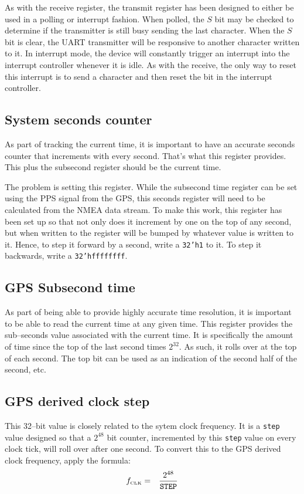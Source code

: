 \documentclass{gqtekspec}
\begin{document}
As with the receive register, the transmit register has been designed to either
be used in a polling or interrupt fashion.  When polled, the $S$ bit may be
checked to determine if the transmitter is still busy sending the last
character.  When the $S$ bit is clear, the UART transmitter will be responsive
to another character written to it.  In interrupt mode, the device will
constantly trigger an interrupt into the interrupt controller whenever  it is
idle.  As with the receive, the only way to reset this interrupt is to send
a character and then reset the bit in the interrupt controller.

\subsection{System seconds counter}
As part of tracking the current time, it is important to have an accurate
seconds counter that increments with every second.  That's what this register
provides.  This plus the subsecond register should be the current time.

The problem is setting this register.  While the subsecond time register can be
set using the PPS signal from the GPS, this seconds register will need to be
calculated from the NMEA data stream.  To make this work, this register has been
set up so that not only does it increment by one on the top of any second, but
when written to the register will be bumped by whatever value is written to it.
Hence, to step it forward by a second, write a {\tt 32'h1} to it.  To step it
backwards, write a {\tt 32'hffffffff}.

\subsection{GPS Subsecond time}
As part of being able to provide highly accurate time resolution, it is 
important to be able to read the current time at any given time.  This
register provides the sub--seconds value associated with the current time.
It is specifically the amount of time since the top of the last second
times $2^{32}$.  As such, it rolls over at the top of each second.  The
top bit can be used as an indication of the second half of the second, etc.

\subsection{GPS derived clock step}
This 32--bit value is closely related to the sytem clock frequency.  It is a 
{\tt step} value designed so that a $2^{48}$ bit counter, incremented by this
{\tt step} value on every clock tick, will roll over after one second.  To
convert this to the GPS derived clock frequency, apply the formula:
\begin{eqnarray}
f_{\mbox{\tiny CLK}} &=& \frac{2^{48}}{\mbox{\tt STEP}}
\end{eqnarray}
\end{document}

